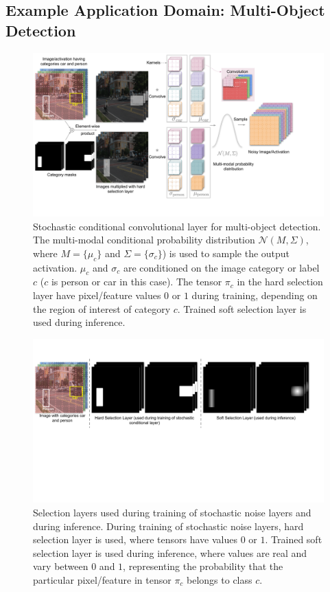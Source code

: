 \documentclass[12pt, letterpaper]{article}
\begin{document}
\subsection{Example Application Domain: Multi-Object Detection}
\label{sec:detection}
\begin{figure}[h!]
    \centering
    \includegraphics[width=\textwidth, trim={0cm 1.6cm 2.7cm 0cm}, clip]{Detection Conditional noise layer.pdf}
    \caption{Stochastic conditional convolutional layer for multi-object detection. The multi-modal conditional probability distribution $\mathcal{N}(M, \Sigma)$, where $M=\{\mu_c\}$ and $\Sigma=\{\sigma_c\}$) is used to sample the output activation. $\mu_c$ and $\sigma_c$ are conditioned on the image category or label $c$ ($c$ is person or car in this case). The tensor $\pi_c$ in the hard selection layer have pixel/feature values $0$ or $1$ during training, depending on the region of interest of category $c$. Trained soft selection layer is used during inference.}
    \label{fig:det}
\end{figure}

\begin{figure}[h!]
    \centering
    \includegraphics[width=\textwidth, trim={0cm 7cm 1cm 2cm}, clip]{category_masks.pdf}
    \caption{Selection layers used during training of stochastic noise layers and during inference. During training of stochastic noise layers, hard selection layer is used, where tensors have values $0$ or $1$. Trained soft selection layer is used during inference, where values are real and vary between $0$ and $1$, representing the  probability that the particular pixel/feature in tensor $\pi_c$ belongs to class $c$.}
    \label{fig:category_masks_det}
\end{figure}
\end{document}
